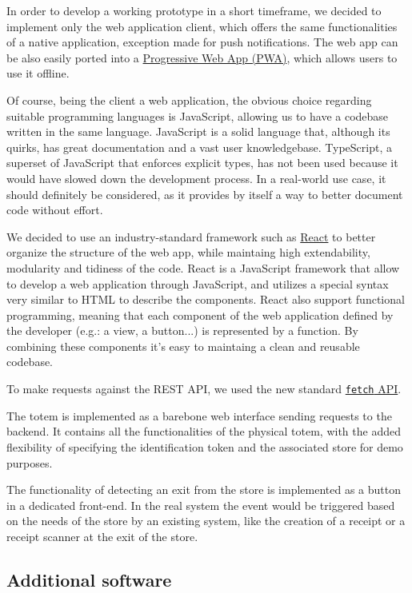 \documentclass[
]{article}
\begin{document}
In order to develop a working prototype in a short timeframe, we decided
to implement only the web application client, which offers the same
functionalities of a native application, exception made for push
notifications. The web app can be also easily ported into a
\href{https://developer.mozilla.org/en-US/docs/Web/Progressive_web_apps}{Progressive
Web App (PWA)}, which allows users to use it offline.

Of course, being the client a web application, the obvious choice
regarding suitable programming languages is JavaScript, allowing us to
have a codebase written in the same language. JavaScript is a solid language that, although its quirks, has great documentation and a vast user knowledgebase. 
TypeScript, a superset of JavaScript that enforces explicit types, has not been used because it would have slowed down the development process. In a real-world use case, it should definitely be considered, as it provides by itself a way to better document code without effort.

We decided to use an industry-standard framework such as
\href{https://reactjs.org/}{React} to better organize the structure of
the web app, while maintaing high extendability, modularity and tidiness
of the code. React is a JavaScript framework that allow to develop a web application through JavaScript, and utilizes a special syntax very similar to HTML to describe the components. React also support functional programming, meaning that each component of the web application defined by the developer (e.g.: a view, a button...) is represented by a function. By combining these components it's easy to maintaing a clean and reusable codebase.

To make requests against the REST API, we used the
new standard
\href{https://developer.mozilla.org/en-US/docs/Web/API/Fetch_API}{\texttt{fetch}
API}.

The totem is implemented as a barebone web interface sending requests to the backend. It contains all the functionalities of the physical totem, with the added flexibility of specifying the identification token and the associated store for demo purposes.

The functionality of detecting an exit from the store is implemented as a button in a dedicated front-end. In the real system the event would be triggered based on the needs of the store by an existing system, like the creation of a receipt or a receipt scanner at the exit of the store.

\hypertarget{additional-software}{%
\subsection{Additional software}\label{additional-software}}
\end{document}
